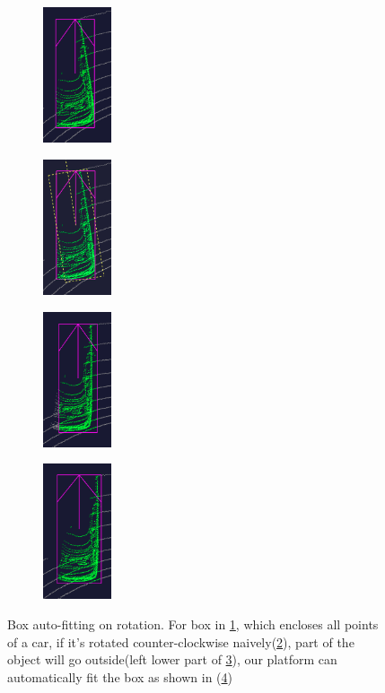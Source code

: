 \documentclass[letterpaper, 10 pt, conference]{ieeeconf}  %
\begin{document}
\begin{figure}[t]
	\centering
	
	\begin{subfigure}[t]{0.2\linewidth}
		\includegraphics[height=4cm]{./figures/points-enclosed}
		\caption{}
		\label{fig:box-before-rotate}
	\end{subfigure}\hfill
	\begin{subfigure}[t]{0.2\linewidth}
		\includegraphics[height=4cm]{./figures/adjust-naively}
		\caption{}
		\label{fig:box-rotate-in-subview}
	\end{subfigure}\hfill
	\begin{subfigure}[t]{0.2\linewidth}
		\includegraphics[height=4cm]{./figures/rotate-fail}
		\caption{}
		\label{fig:box-rotate-naively}
	\end{subfigure}\hfill
	\begin{subfigure}[t]{0.2\linewidth}
		\includegraphics[height=4cm]{./figures/rotate-success}
		\caption{}
		\label{fig:box-rotate-correctly}
	\end{subfigure}\hfill
	\caption{Box auto-fitting on rotation. For box in \ref{fig:box-before-rotate}, which encloses all points of a car, if it's rotated counter-clockwise naively(\ref{fig:box-rotate-in-subview}), part of the object will go outside(left lower part of \ref{fig:box-rotate-naively}), our platform can automatically fit the box as shown in (\ref{fig:box-rotate-correctly})}
	\label{fig:boundary-aware-rotation}
	\vspace{-0.3cm}
\end{figure}
\end{document}

